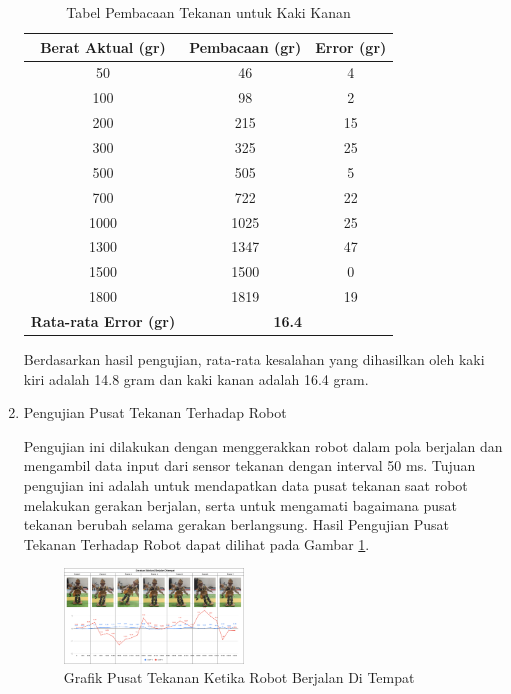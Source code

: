 \begin{enumerate}[label=\Alph*.]
        \begin{table}[h!]
            \centering
            \caption{Tabel Pembacaan Tekanan untuk Kaki Kanan}
            \begin{tabular}{|c|c|c|}
                \hline
                \textbf{Berat Aktual (gr)} & \textbf{Pembacaan (gr)} & \textbf{Error (gr)} \\
                \hline
                50    & 46    & 4    \\
                100   & 98    & 2    \\
                200   & 215   & 15   \\
                300   & 325   & 25   \\
                500   & 505   & 5    \\
                700   & 722   & 22   \\
                1000  & 1025  & 25   \\
                1300  & 1347  & 47   \\
                1500  & 1500  & 0    \\
                1800  & 1819  & 19   \\
                \hline
                \textbf{Rata-rata Error (gr)} & \multicolumn{2}{c|}{\textbf{16.4}} \\
                \hline
            \end{tabular}
            \label{tab:pengukuran_berat_kaki_kanan}
        \end{table}

        \hspace*{1em} Berdasarkan hasil pengujian, rata-rata kesalahan yang dihasilkan oleh kaki kiri adalah 14.8 gram dan kaki kanan adalah 16.4 gram.

    \item Pengujian Pusat Tekanan Terhadap Robot
    \label{subsec:hasil-pembahasan-pusat-tekanan}

        \hspace*{1em} Pengujian ini dilakukan dengan menggerakkan robot dalam pola berjalan dan mengambil data input dari sensor tekanan dengan interval 50 ms. Tujuan pengujian ini adalah untuk mendapatkan data pusat tekanan saat robot melakukan gerakan berjalan, serta untuk mengamati bagaimana pusat tekanan berubah selama gerakan berlangsung. Hasil Pengujian Pusat Tekanan Terhadap Robot dapat dilihat pada Gambar \ref{fig:pusat_tekanan_robot}.

        \begin{figure}[h]
            \centering
            \includegraphics[width=0.45\textwidth]{gambar/motion_berjalan.png}
            \caption{Grafik Pusat Tekanan Ketika Robot Berjalan Di Tempat}
            \label{fig:pusat_tekanan_robot}
        \end{figure}


\end{enumerate}
